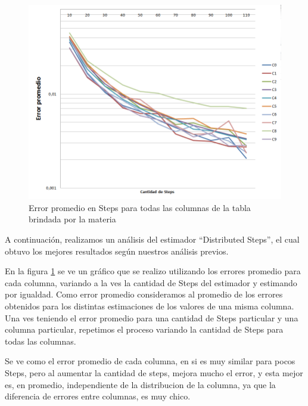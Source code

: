\begin{figure}[H]
	    \includegraphics[scale=.60]{imagenes/variacion_parametro_y_columna_steps.png}
	    \caption{Error promedio en Steps para todas las columnas de la tabla brindada por la materia} 
	    \label{fig:variacion_parametro_y_columna_steps}
\end{figure}

	A continuaci\'on, realizamos un an\'alisis del estimador ``Distributed Steps'', el cual obtuvo los mejores resultados seg\'un nuestros an\'alisis previos.
	
	En la figura \ref{fig:variacion_parametro_y_columna_steps} se ve un gr\'afico que se realizo utilizando los errores promedio para cada columna, variando a la ves la cantidad de Steps del estimador y estimando por igualdad. Como error promedio consideramos al promedio de los errores obtenidos para los distintas estimaciones de los valores de una misma columna. Una ves teniendo el error promedio para una cantidad de Steps particular y una columna particular, repetimos el proceso variando la cantidad de Steps para todas las columnas.
	
	Se ve como el error promedio de cada columna, en si es muy similar para pocos Steps, pero al aumentar la cantidad de steps, mejora mucho el error, y esta mejor es, en promedio, independiente de la distribucion de la columna, ya que la diferencia de errores entre columnas, es muy chico.

